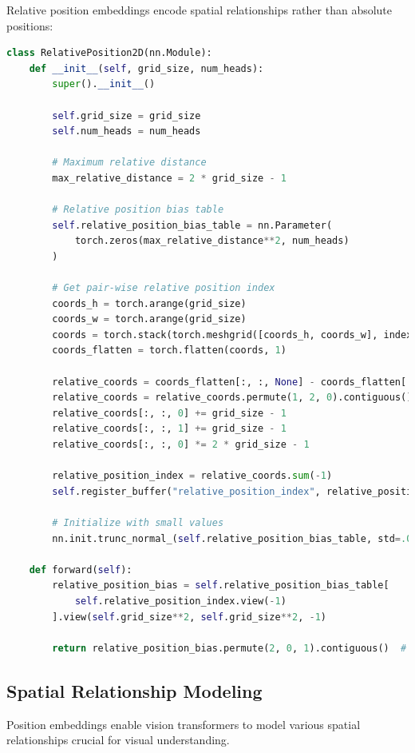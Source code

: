 Relative position embeddings encode spatial relationships rather than absolute positions:

\begin{lstlisting}[language=Python, caption=2D relative position embeddings]
class RelativePosition2D(nn.Module):
    def __init__(self, grid_size, num_heads):
        super().__init__()
        
        self.grid_size = grid_size
        self.num_heads = num_heads
        
        # Maximum relative distance
        max_relative_distance = 2 * grid_size - 1
        
        # Relative position bias table
        self.relative_position_bias_table = nn.Parameter(
            torch.zeros(max_relative_distance**2, num_heads)
        )
        
        # Get pair-wise relative position index
        coords_h = torch.arange(grid_size)
        coords_w = torch.arange(grid_size)
        coords = torch.stack(torch.meshgrid([coords_h, coords_w], indexing='ij'))
        coords_flatten = torch.flatten(coords, 1)
        
        relative_coords = coords_flatten[:, :, None] - coords_flatten[:, None, :]
        relative_coords = relative_coords.permute(1, 2, 0).contiguous()
        relative_coords[:, :, 0] += grid_size - 1
        relative_coords[:, :, 1] += grid_size - 1
        relative_coords[:, :, 0] *= 2 * grid_size - 1
        
        relative_position_index = relative_coords.sum(-1)
        self.register_buffer("relative_position_index", relative_position_index)
        
        # Initialize with small values
        nn.init.trunc_normal_(self.relative_position_bias_table, std=.02)
    
    def forward(self):
        relative_position_bias = self.relative_position_bias_table[
            self.relative_position_index.view(-1)
        ].view(self.grid_size**2, self.grid_size**2, -1)
        
        return relative_position_bias.permute(2, 0, 1).contiguous()  # [num_heads, N, N]
\end{lstlisting}

\subsection{Spatial Relationship Modeling}

Position embeddings enable vision transformers to model various spatial relationships crucial for visual understanding.

